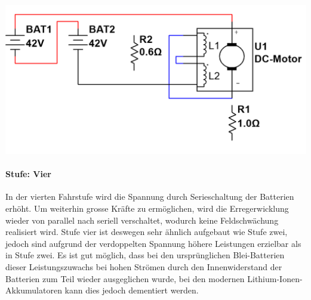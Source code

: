 \begin{minipage}{0.49\textwidth}
	\includegraphics[width=\columnwidth]{images/Stufenschalter/Stufe_4.png}%
\end{minipage}
\begin{minipage}{0.5\textwidth}
	\paragraph{Stufe: Vier}
	In der vierten Fahrstufe wird die Spannung durch Serieschaltung der Batterien erhöht. Um weiterhin grosse Kräfte zu ermöglichen, wird die Erregerwicklung wieder von parallel nach seriell verschaltet, wodurch keine Feldschwächung realisiert wird. Stufe vier ist deswegen sehr ähnlich aufgebaut wie Stufe zwei, jedoch sind aufgrund der verdoppelten Spannung höhere Leistungen erzielbar als in Stufe zwei. Es ist gut möglich, dass bei den ursprünglichen Blei-Batterien dieser Leistungszuwachs bei hohen Strömen durch den Innenwiderstand der Batterien zum Teil wieder ausgeglichen wurde, bei den modernen Lithium-Ionen-Akkumulatoren kann dies jedoch dementiert werden.
\end{minipage}

